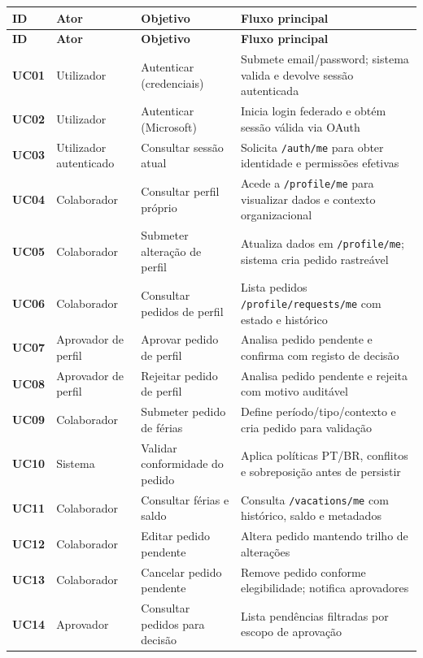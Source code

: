 \documentclass[11pt,a4paper,twoside]{article}
\newcommand{\tH}[1]{\textbf{\sffamily\small\color{white}#1}}
\newcommand{\theadrow}{\rowcolor{ACCENT}}
\begin{document}
\begin{longtable}{>{\small\centering\arraybackslash\bfseries}p{0.85cm} >{\small}p{2.6cm} >{\small}p{3.5cm} >{\small}p{6.3cm}}
\theadrow
\tH{ID} & \tH{Ator} & \tH{Objetivo} & \tH{Fluxo principal} \\
\midrule
\endfirsthead
\theadrow
\tH{ID} & \tH{Ator} & \tH{Objetivo} & \tH{Fluxo principal} \\
\midrule
\endhead
UC01 & Utilizador & Autenticar (credenciais) & Submete email/password; sistema valida e devolve sessão autenticada \\
UC02 & Utilizador & Autenticar (Microsoft) & Inicia login federado e obtém sessão válida via OAuth \\
UC03 & Utilizador autenticado & Consultar sessão atual & Solicita \texttt{/auth/me} para obter identidade e permissões efetivas \\
UC04 & Colaborador & Consultar perfil próprio & Acede a \texttt{/profile/me} para visualizar dados e contexto organizacional \\
UC05 & Colaborador & Submeter alteração de perfil & Atualiza dados em \texttt{/profile/me}; sistema cria pedido rastreável \\
UC06 & Colaborador & Consultar pedidos de perfil & Lista pedidos \texttt{/profile/requests/me} com estado e histórico \\
UC07 & Aprovador de perfil & Aprovar pedido de perfil & Analisa pedido pendente e confirma com registo de decisão \\
UC08 & Aprovador de perfil & Rejeitar pedido de perfil & Analisa pedido pendente e rejeita com motivo auditável \\
UC09 & Colaborador & Submeter pedido de férias & Define período/tipo/contexto e cria pedido para validação \\
UC10 & Sistema & Validar conformidade do pedido & Aplica políticas PT/BR, conflitos e sobreposição antes de persistir \\
UC11 & Colaborador & Consultar férias e saldo & Consulta \texttt{/vacations/me} com histórico, saldo e metadados \\
UC12 & Colaborador & Editar pedido pendente & Altera pedido mantendo trilho de alterações \\
UC13 & Colaborador & Cancelar pedido pendente & Remove pedido conforme elegibilidade; notifica aprovadores \\
UC14 & Aprovador & Consultar pedidos para decisão & Lista pendências filtradas por escopo de aprovação \\

\end{longtable}
\end{document}
